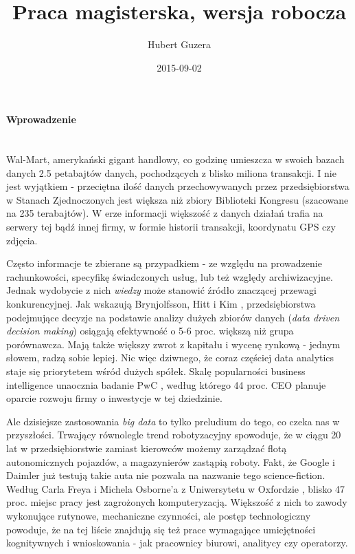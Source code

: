 \documentclass{article}
\title{Praca magisterska, wersja robocza}
\date{2015-09-02}
\author{Hubert Guzera}
\begin{document}
\maketitle




\paragraph{Wprowadzenie} \mbox{}\\

Wal-Mart, amerykański gigant handlowy, co godzinę umieszcza w swoich bazach danych 2.5 petabajtów danych, pochodzących z blisko miliona transakcji. I nie jest wyjątkiem - przeciętna ilość danych przechowywanych przez przedsiębiorstwa w Stanach Zjednoczonych jest większa niż zbiory Biblioteki Kongresu (szacowane na 235 terabajtów). W erze informacji większość z danych działań trafia na serwery tej bądź innej firmy, w formie historii transakcji, koordynatu GPS czy zdjęcia. 

Często informacje te zbierane są przypadkiem - ze względu na prowadzenie rachunkowości, specyfikę świadczonych usług, lub też względy archiwizacyjne. Jednak wydobycie z nich \textit{wiedzy} może stanowić źródło znaczącej przewagi konkurencyjnej.  Jak wskazują Brynjolfsson, Hitt i Kim \cite{Brynjolfsson2011}, przedsiębiorstwa podejmujące decyzje na podstawie analizy dużych zbiorów danych (\textit{data driven decision making}) osiągają efektywność o 5-6 proc. większą niż grupa porównawcza. Mają także większy zwrot z kapitału i wycenę rynkową - jednym słowem, radzą sobie lepiej. Nic więc dziwnego, że coraz częściej data analytics staje się priorytetem wśród dużych spółek. Skalę popularności business intelligence unaocznia badanie PwC \cite{PwC2014}, według którego 44 proc. CEO planuje oparcie rozwoju firmy o inwestycje w tej dziedzinie. 

Ale dzisiejsze zastosowania \textit{big data} to tylko preludium do tego, co czeka nas w przyszłości. Trwający równolegle trend robotyzacyjny spowoduje, że w ciągu 20 lat w przedsiębiorstwie zamiast kierowców możemy zarządzać flotą autonomicznych pojazdów, a magazynierów zastąpią roboty. Fakt, że Google i Daimler już testują takie auta nie pozwala na nazwanie tego science-fiction. Według Carla Freya i Michela Osborne'a z Uniwersytetu w Oxfordzie \cite{Frey2013}, blisko 47 proc. miejsc pracy jest zagrożonych komputeryzacją. Większość z nich to zawody wykonujące rutynowe, mechaniczne czynności, ale postęp technologiczny powoduje, że na tej liście znajdują się też prace wymagające umiejętności kognitywnych i wnioskowania - jak pracownicy biurowi, analitycy czy operatorzy. 
\end{document}
